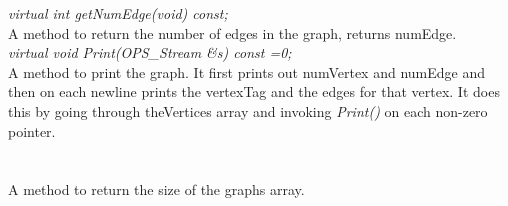 {\em virtual int getNumEdge(void) const;} \\
A method to return the number of edges in the graph, returns numEdge. \\


{\em virtual void Print(OPS_Stream \&s) const =0;} \\
A method to print the graph. It first prints out numVertex and numEdge
and then on each newline prints the vertexTag and the edges for that
vertex. It does this by going through theVertices array and invoking
{\em Print()}  on each non-zero pointer.\\

  \\
 \\
A method to return the size of the graphs array. \\





